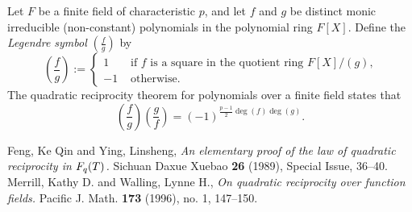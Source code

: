 \documentclass{article}
\begin{document}
Let $F$ be a finite field of characteristic $p$, and let $f$ and $g$ be distinct monic irreducible (non-constant) polynomials in the polynomial ring $F[X]$. Define the {\em Legendre symbol} $\left(\frac{f}{g}\right)$ by
$$
\left(\frac{f}{g}\right) :=
\begin{cases}
1 & \text{ if $f$ is a square in the quotient ring $F[X]/(g)$,} \\
-1 & \text{ otherwise.}
\end{cases}
$$
The quadratic reciprocity theorem for polynomials over a finite field states that
$$
\left(\frac{f}{g}\right) \left(\frac{g}{f}\right) = (-1)^{\frac{p-1}{2} \deg(f) \deg(g)}.
$$
\begin{thebibliography}{9}
Feng, Ke Qin and Ying, Linsheng,
{\em An elementary proof of the law of quadratic reciprocity in $F\sb q(T)$.}
Sichuan Daxue Xuebao {\bf 26} (1989), Special Issue, 36--40.
Merrill, Kathy D. and Walling, Lynne H.,
{\em On quadratic reciprocity over function fields.}
Pacific J. Math. {\bf 173} (1996), no. 1, 147--150.
\end{thebibliography}
\end{document}
